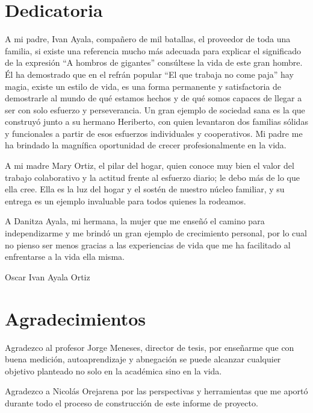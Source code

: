 \documentclass[12pt, letterpaper]{report}
\begin{document}
\chapter*{Dedicatoria}

A mi padre, Ivan Ayala, compañero de mil batallas, el proveedor de toda una familia, si
existe una referencia mucho más adecuada para explicar el significado de la expresión ``A
hombros de gigantes'' consúltese la vida de este gran hombre. Él ha demostrado que en el
refrán popular ``El que trabaja no come paja'' hay magia, existe un estilo de vida, es una
forma permanente y satisfactoria de demostrarle al mundo de qué estamos hechos y de qué
somos capaces de llegar a ser con solo esfuerzo y perseverancia. Un gran ejemplo de
sociedad sana es la que construyó junto a su hermano Heriberto, con quien levantaron dos
familias sólidas y funcionales a partir de esos esfuerzos individuales y cooperativos. Mi
padre me ha brindado la magnífica oportunidad de crecer profesionalmente en la vida.

A mi madre Mary Ortiz, el pilar del hogar, quien conoce muy bien el valor del trabajo
colaborativo y la actitud frente al esfuerzo diario; le debo más de lo que ella cree. Ella
es la luz del hogar y el sostén de nuestro núcleo familiar, y su entrega es un ejemplo
invaluable para todos quienes la rodeamos.

A Danitza Ayala, mi hermana, la mujer que me enseñó el camino para independizarme y me
brindó un gran ejemplo de crecimiento personal, por lo cual no pienso ser menos gracias a
las experiencias de vida que me ha facilitado al enfrentarse a la vida ella misma.

\begin{flushright}
Oscar Ivan Ayala Ortiz
\end{flushright}

\chapter*{Agradecimientos}

Agradezco al profesor Jorge Meneses, director de tesis, por enseñarme que con buena
medición, autoaprendizaje y abnegación se puede alcanzar cualquier objetivo planteado no
solo en la académica sino en la vida.

Agradezco a Nicolás Orejarena por las perspectivas y herramientas que me aportó
durante todo el proceso de construcción de este informe de proyecto.
\end{document}
